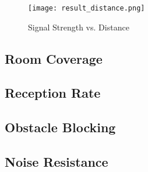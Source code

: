 \begin{figure}
  \centering
  \texttt{[image: result\_distance.png]}
  \caption{Signal Strength vs. Distance}
  \label{fig:strength}
\end{figure}

\subsection{Room Coverage}
\label{sec:room-coverage}

\subsection{Reception Rate}
\label{sec:reception-rate}

\subsection{Obstacle Blocking}
\label{sec:obstacle-blocking}

\subsection{Noise Resistance}
\label{sec:noise-resistance}



